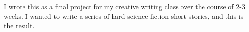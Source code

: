 \documentclass[main.tex]{subfiles}
\begin{document}
	I wrote this as a final project for my creative writing class over the course of 2-3 weeks.
	I wanted to write a series of hard science fiction short stories, and this is the result.
	
\end{document}
